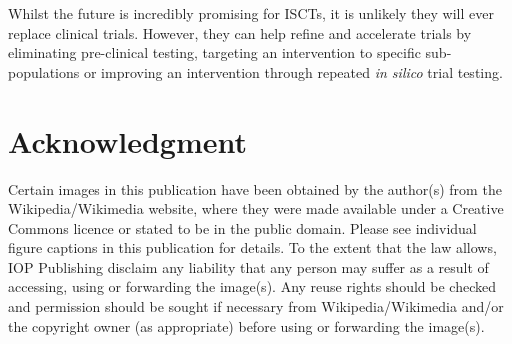 \documentclass{article}
\begin{document}
Whilst the future is incredibly promising for ISCTs, it is unlikely they will ever replace clinical trials. However, they can help refine and accelerate trials by eliminating pre-clinical testing, targeting an intervention to specific sub-populations or improving an intervention through repeated \textit{in silico} trial testing.


\section*{Acknowledgment}

Certain images in this publication have been obtained by the author(s) from the Wikipedia/Wikimedia website, where they were made available under a Creative Commons licence or stated to be in the public domain.
Please see individual figure captions in this publication for details.
To the extent that the law allows, IOP Publishing disclaim any liability that any person may suffer as a result of accessing, using or forwarding the image(s).
Any reuse rights should be checked and permission should be sought if necessary from Wikipedia/Wikimedia and/or the copyright owner (as appropriate) before using or forwarding the image(s).

{}
\end{document}
